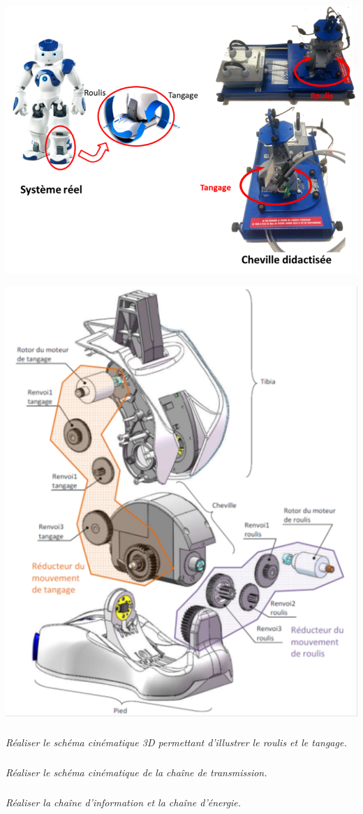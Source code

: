 \documentclass[10pt,fleqn]{article} %
\begin{document}
\begin{multicols}{2}
\setcounter{exo}{0}
\begin{center}
\includegraphics[width=\linewidth]{images/nao_02}
\end{center}

\begin{center}
\includegraphics[width=\linewidth]{images/nao_01}
\end{center}



\subparagraph{}
\textit{Réaliser le schéma cinématique 3D permettant d'illustrer le roulis et le tangage.}


\subparagraph{}
\textit{Réaliser le schéma cinématique de la chaîne de transmission.}


\subparagraph{}
\textit{Réaliser la chaîne d'information et la chaîne d'énergie.}

\end{multicols}
\end{document}
